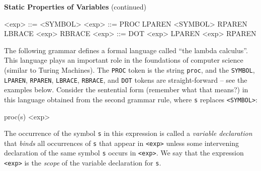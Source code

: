 \begin{minipage}[t]{\sw}
\slidenumber
\LARGE
{\bf Static Properties of Variables} (continued)\exx
\begin{SaveVerbatim}{\MYlambda}
<exp> ::= <SYMBOL>
<exp> ::= PROC LPAREN <SYMBOL> RPAREN LBRACE <exp> RBRACE
<exp> ::= DOT <exp> LPAREN <exp> RPAREN
\end{SaveVerbatim}
The following grammar defines a formal language
called ``the lambda calculus''.
This language plays an important role
in the foundations of computer science
(similar to Turing Machines).
The \verb'PROC' token is the string \verb'proc',
and the \verb'SYMBOL', \verb'LPAREN', \verb'RPAREN',
\verb'LBRACE', \verb'RBRACE', and \verb'DOT'
tokens are straight-forward -- see the examples below.\exx
\emm{\Large\LightBox{\MYlambda}}\exx
Consider the sentential form (remember what that means?) in this language
obtained from the second grammar rule,
where \verb's' replaces \verb'<SYMBOL>':
\begin{qv}
proc(s) { <exp> }
\end{qv}
The occurrence of the symbol \verb's' in this expression
is called a {\em variable declaration}
that {\em binds} all occurrences
of \verb's' that appear in \verb'<exp>'
unless some intervening declaration of the same symbol \verb's'
occurs in \verb'<exp>'.
We say that the expression \verb'<exp>'
is the {\em scope} of the variable declaration for \verb's'.\exx
\end{minipage}
\clearpage
